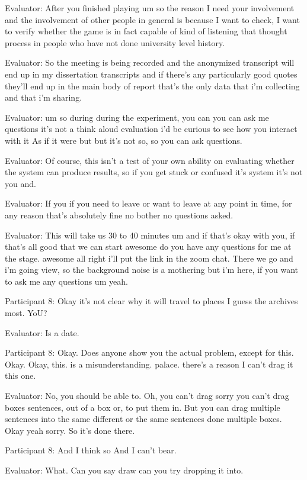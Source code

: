 \documentclass{l4proj}
\begin{document}
\begin{appendices}
Evaluator: After you finished playing um so the reason I need your involvement and the involvement of other people in general is because I want to check, I want to verify whether the game is in fact capable of kind of listening that thought process in people who have not done university level history.

Evaluator: So the meeting is being recorded and the anonymized transcript will end up in my dissertation transcripts and if there's any particularly good quotes they'll end up in the main body of report that's the only data that i'm collecting and that i'm sharing.

Evaluator: um so during during the experiment, you can you can ask me questions it's not a think aloud evaluation i'd be curious to see how you interact with it As if it were but but it's not so, so you can ask questions.

Evaluator: Of course, this isn't a test of your own ability on evaluating whether the system can produce results, so if you get stuck or confused it's system it's not you and.

Evaluator: If you if you need to leave or want to leave at any point in time, for any reason that's absolutely fine no bother no questions asked.

Evaluator: This will take us 30 to 40 minutes um and if that's okay with you, if that's all good that we can start awesome do you have any questions for me at the stage. awesome all right i'll put the link in the zoom chat. There we go and i'm going view, so the background noise is a mothering but i'm here, if you want to ask me any questions um yeah.

Participant 8: Okay it's not clear why it will travel to places I guess the archives most. YoU?

Evaluator: Is a date.

Participant 8: Okay. Does anyone show you the actual problem, except for this. Okay. Okay, this. is a misunderstanding. palace. there's a reason I can't drag it this one.

Evaluator: No, you should be able to. Oh, you can't drag sorry you can't drag boxes sentences, out of a box or, to put them in. But you can drag multiple sentences into the same different or the same sentences done multiple boxes. Okay yeah sorry. So it's done there.

Participant 8: And I think so And I can't bear.

Evaluator: What. Can you say draw can you try dropping it into.


\end{appendices}
\end{document}
